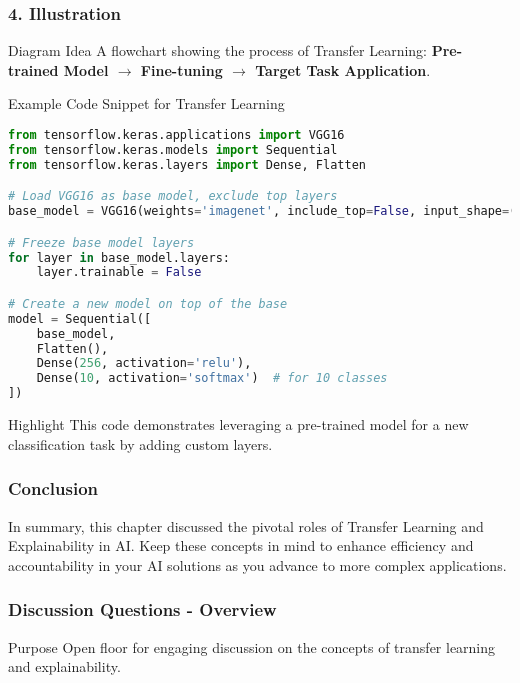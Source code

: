 \documentclass[aspectratio=169]{beamer}
\begin{document}
\begin{frame}
    \frametitle{4. Illustration}
    \begin{block}{Diagram Idea}
        A flowchart showing the process of Transfer Learning: 
        \textbf{Pre-trained Model $\rightarrow$ Fine-tuning $\rightarrow$ Target Task Application}.
    \end{block}
    \begin{block}{Example Code Snippet for Transfer Learning}
        \begin{lstlisting}[language=Python]
from tensorflow.keras.applications import VGG16
from tensorflow.keras.models import Sequential
from tensorflow.keras.layers import Dense, Flatten

# Load VGG16 as base model, exclude top layers
base_model = VGG16(weights='imagenet', include_top=False, input_shape=(224, 224, 3))

# Freeze base model layers
for layer in base_model.layers:
    layer.trainable = False

# Create a new model on top of the base
model = Sequential([
    base_model,
    Flatten(),
    Dense(256, activation='relu'),
    Dense(10, activation='softmax')  # for 10 classes
])
        \end{lstlisting}
    \end{block}
    \begin{block}{Highlight}
        This code demonstrates leveraging a pre-trained model for a new classification task by adding custom layers.
    \end{block}
\end{frame}

\begin{frame}
    \frametitle{Conclusion}
    In summary, this chapter discussed the pivotal roles of Transfer Learning and Explainability in AI. 
    Keep these concepts in mind to enhance efficiency and accountability in your AI solutions as you advance to more complex applications.
\end{frame}

\begin{frame}[fragile]
    \frametitle{Discussion Questions - Overview}
    \begin{block}{Purpose}
        Open floor for engaging discussion on the concepts of transfer learning and explainability.
    \end{block}
\end{frame}
\end{document}
